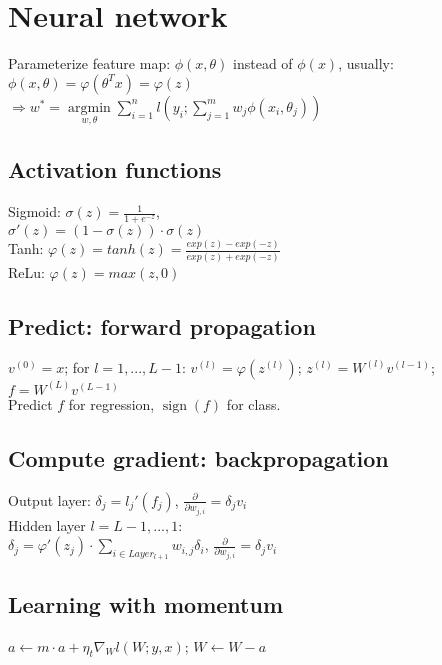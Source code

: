 \section*{Neural network}
Parameterize feature map: $\phi(x,\theta)$ instead of $\phi(x)$, usually: $\phi(x,\theta) = \varphi(\theta^T x) = \varphi(z)$\\
$\Rightarrow w^* = \underset{w, \theta}{\operatorname{argmin}} \sum_{i=1}^n l(y_i; \sum_{j=1}^m w_j \phi(x_i, \theta_j))$

\subsection*{Activation functions}
Sigmoid: $\sigma(z)=\frac{1}{1+e^{-z}}$,\\
$\sigma'(z) = (1 - \sigma(z))\cdot\sigma(z)$\\
Tanh: $\varphi(z) = tanh(z) = \frac{exp(z)-exp(-z)}{exp(z)+exp(-z)}$\\
ReLu:  $\varphi(z) = max(z,0)$

\subsection*{Predict: forward propagation}
$v^{(0)} = x$; for $l = 1,...,L-1$:
$v^{(l)} = \varphi(z^{(l)})$; $z^{(l)} = W^{(l)}v^{(l-1)}$;
$f = W^{(L)}v^{(L-1)}$\\
Predict $f$ for regression, $\operatorname{sign}(f)$ for class.

\subsection*{Compute gradient: backpropagation}
Output layer: 
$\delta_j = l_j'(f_j)$,
$\frac{\partial}{\partial w_{j,i}} = \delta_j v_i$\\
Hidden layer $l=L-1,...,1$:\\
$\delta_j = \varphi'(z_j) \cdot \sum_{i\in Layer_{l+1}} w_{i,j}\delta_i$,
$\frac{\partial}{\partial w_{j,i}} = \delta_j v_i$

\subsection*{Learning with momentum}
$a \leftarrow m \cdot a + \eta_t \nabla_W l(W;y,x)$; $W \leftarrow W - a$